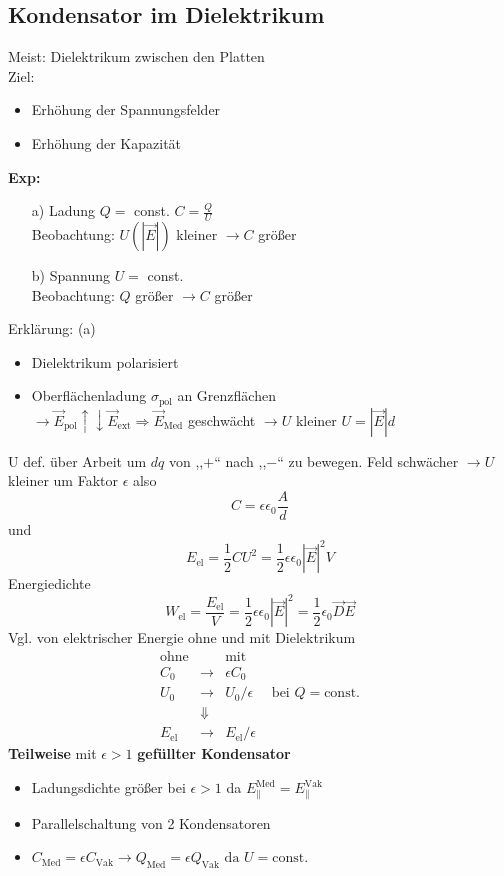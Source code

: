 \documentclass[titlepage,12pt,a4paper,ngerman]{report}
\newcommand{\tx}[1]{\textrm{#1}}
\begin{document}
\subsection{Kondensator im Dielektrikum}
Meist: Dielektrikum zwischen den Platten \\
Ziel: \begin{itemize}
\item Erhöhung der Spannungsfelder
\item Erhöhung der Kapazität
\end{itemize}
\textbf{Exp:} \begin{itemize}
\item[a)] Ladung $Q =$ const. $C = \frac{Q}{U}$\\
Beobachtung: $U(|\vec{E}|) $ kleiner $\rightarrow C$ größer
\item[b)] Spannung $U = $ const. \\
Beobachtung: $Q$ größer $\rightarrow C$ größer
\end{itemize}
Erklärung: (a)
\begin{itemize}
\item Dielektrikum polarisiert
\item Oberflächenladung $\sigma_{\tx{pol}}$ an Grenzflächen\\
$\rightarrow \vec{E}_{\tx{pol}} \uparrow \downarrow \vec{E}_{\tx{ext}} \Rightarrow \vec{E}_{\tx{Med}} $ geschwächt $\rightarrow U$ kleiner $ U = |\vec{E}|d$
\end{itemize}
U def. über Arbeit um $dq$ von ,,$+$`` nach ,,$-$`` zu bewegen. Feld schwächer $\rightarrow U$ kleiner um Faktor $\epsilon$ also
$$\boxed{ C = \epsilon \epsilon_0 \frac{A}{d} }$$
und $$E_{\tx{el}} = \frac{1}{2} C U^2 = \frac{1}{2} \epsilon \epsilon_0 |\vec{E}|^2 V$$
Energiedichte $$W_{\tx{el}} = \frac{E_{\tx{el}}}{V} = \frac{1}{2} \epsilon\epsilon_0 | \vec{E} | ^2 = \frac{1}{2} \epsilon_0 \vec{D} \vec{E}$$
Vgl. von elektrischer Energie ohne und mit Dielektrikum
$$\begin{array}{cccc}
\tx{ohne}&&\tx{mit} \\
C_0 & \rightarrow & \epsilon C_0 \\
U_0 & \rightarrow & U_0/ \epsilon & \tx{ bei } Q = \tx{const.} \\
& \Downarrow\\
E_{\tx{el}} &\rightarrow & E_{\tx{el}} / \epsilon
\end{array}$$
\textbf{Teilweise} mit $\epsilon > 1$ \textbf{gefüllter Kondensator}
\begin{itemize}
\item Ladungsdichte größer bei $ \epsilon >1 $ da $E_{\parallel}^{\tx{Med}} = E_{\parallel}^{\tx{Vak}}$
\item Parallelschaltung von 2 Kondensatoren
\item $ C_{\tx{Med}} = \epsilon C_{\tx{Vak}} \rightarrow Q_{\tx{Med}} = \epsilon Q_{\tx{Vak}} \tx{ da } U = \tx{const.}$
\end{itemize}
\end{document}
